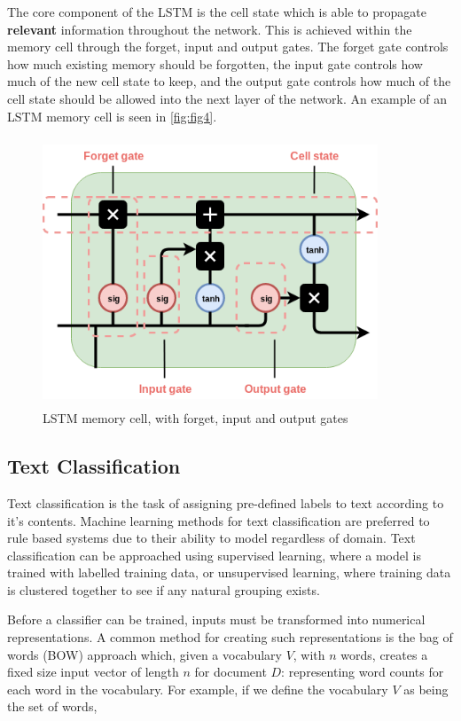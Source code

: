 \noindent
\newline
The core component of the LSTM is the cell state which is able to propagate \textbf{relevant} information throughout the network. This is achieved within the memory cell through the forget, input and output gates. The forget gate controls how much existing memory should be forgotten, the input gate controls how much of the new cell state to keep, and the output gate controls how much of the cell state should be allowed into the next layer of the network. An example of an LSTM memory cell is seen in \autoref{fig:fig4}.

\begin{figure}[ht]
	\includegraphics[width=10cm, height=8cm]{./figures/fig4}
	\centering
	\caption[LSTM Memory Cell]{LSTM memory cell, with forget, input and output gates}
	\label{fig:fig4}
\end{figure}

\subsection{Text Classification}
Text classification is the task of assigning pre-defined labels to text according to it's contents. Machine learning methods for text classification are preferred to rule based systems due to their ability to model regardless of domain. Text classification can be approached using supervised learning, where a model is trained with labelled training data, or unsupervised learning, where training data is clustered together to see if any natural grouping exists.

\noindent
\newline
Before a classifier can be trained, inputs must be transformed into numerical representations. A common method for creating such representations is the bag of words (BOW) approach which, given a vocabulary \(V\), with \(n\) words, creates a fixed size input vector of length \(n\) for document \(D\): representing word counts for each word in the vocabulary. For example, if we define the vocabulary \(V\) as being the set of words,

